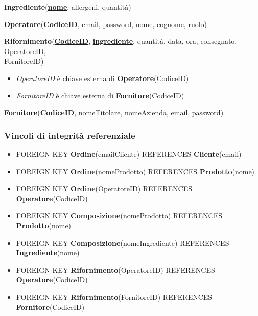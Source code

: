 \documentclass[12pt,a4paper]{article}
\begin{document}
    \begin{tcolorbox}[
        colback=gray!8,
        colframe=black!30,
        title=
    ]
        \textbf{Ingrediente}(\textbf{\uline{nome}}, allergeni, quantità)
    \end{tcolorbox}

    \begin{tcolorbox}[
        colback=gray!8,
        colframe=black!30,
        title=
    ]
        \textbf{Operatore}(\textbf{\uline{CodiceID}}, email, password, nome, cognome, ruolo)
    \end{tcolorbox}

    \begin{tcolorbox}[
        colback=gray!8,
        colframe=black!30,
        title=
    ]
        \textbf{Rifornimento}(\textbf{\uline{CodiceID}}, \textbf{\uline{ingrediente}}, quantità, data, ora, consegnato, OperatoreID, \\FornitoreID)
        \begin{itemize}[leftmargin=1em]
            \item \textit{OperatoreID} è chiave esterna di \textbf{Operatore}(CodiceID)
            \item \textit{FornitoreID} è chiave esterna di \textbf{Fornitore}(CodiceID)
        \end{itemize}
    \end{tcolorbox}

    \begin{tcolorbox}[
        colback=gray!8,
        colframe=black!30,
        title=
    ]
        \textbf{Fornitore}(\textbf{\uline{CodiceID}}, nomeTitolare, nomeAzienda, email, password) 
    \end{tcolorbox}
    
    \subsubsection{Vincoli di integrità referenziale}
    \begin{itemize}[leftmargin=1em]
        \item FOREIGN KEY \textbf{Ordine}(emailCliente) REFERENCES \textbf{Cliente}(email)
        \item FOREIGN KEY \textbf{Ordine}(nomeProdotto) REFERENCES \textbf{Prodotto}(nome)
        \item FOREIGN KEY \textbf{Ordine}(OperatoreID) REFERENCES \textbf{Operatore}(CodiceID)
        \item FOREIGN KEY \textbf{Composizione}(nomeProdotto) REFERENCES \textbf{Prodotto}(nome)
        \item FOREIGN KEY \textbf{Composizione}(nomeIngrediente) REFERENCES \textbf{Ingrediente}(nome)
        \item FOREIGN KEY \textbf{Rifornimento}(OperatoreID) REFERENCES \textbf{Operatore}(CodiceID)
        \item FOREIGN KEY \textbf{Rifornimento}(FornitoreID) REFERENCES \textbf{Fornitore}(CodiceID)
    \end{itemize}
 
\end{document}
